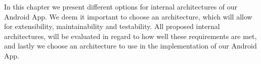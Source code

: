 In this chapter we present different options for internal architectures of our Android App.
We deem it important to choose an architecture, which will allow for extensibility, maintainability and testability.
All proposed internal architectures, will be evaluated in regard to how well these requirements are met, and lastly we choose an architecture to use in the implementation of our Android App.
